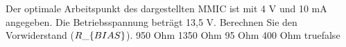     {Der optimale Arbeitspunkt des dargestellten MMIC ist mit 4 V und 10 mA angegeben. Die Betriebsspannung beträgt 13,5 V. Berechnen Sie den Vorwiderstand ($R\_\text\{BIAS\}$).}
    {950 Ohm}
    {1350 Ohm}
    {95 Ohm}
    {400 Ohm}
    {true}{false}